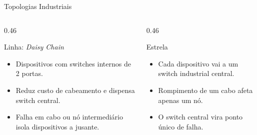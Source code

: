 \documentclass[10pt, aspectratio=169]{beamer}
\begin{document}
\begin{frame}{Topologias Industriais}
    \small
    \begin{columns}[T,totalwidth=\textwidth]
        \begin{column}{0.46\textwidth}
            \begin{block}{Linha: \textit{Daisy Chain}}
                \begin{itemize}
                    \item Dispositivos com switches internos de 2 portas.
                    \item Reduz custo de cabeamento e dispensa switch central.
                    \item Falha em cabo ou n\'o intermedi\'ario isola dispositivos a jusante.
                \end{itemize}
            \end{block}
        \end{column}
        \begin{column}{0.46\textwidth}
            \begin{block}{Estrela}
                \begin{itemize}
                    \item Cada dispositivo vai a um switch industrial central.
                    \item Rompimento de um cabo afeta apenas um n\'o.
                    \item O switch central vira ponto \'unico de falha.
                \end{itemize}
            \end{block}
        \end{column}
    \end{columns}
\end{frame}
\end{document}
